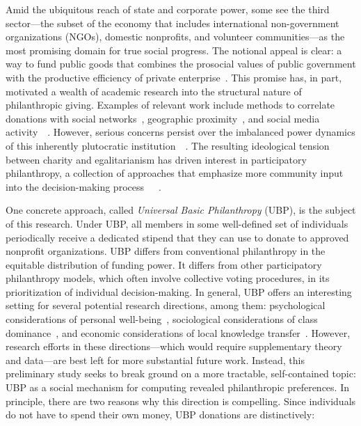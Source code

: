 Amid the ubiquitous reach of state and corporate power, some see the third sector---the subset of the economy that includes international non-government organizations (NGOs), domestic nonprofits, and volunteer communities---as the most promising domain for true social progress.
The notional appeal is clear: a way to fund public goods that combines the prosocial values of public government with the productive efficiency of private enterprise~\cite{etzioni1973third}.
This promise has, in part, motivated a wealth of academic research into the structural nature of philanthropic giving.
Examples of relevant work include methods to correlate donations with social networks~\cite{apinunmahakul2008social}, geographic proximity~\cite{chapman2022give}, and social media activity~\cite{korolov2016predicting}~\cite{saxton2014social}.
However, serious concerns persist over the imbalanced power dynamics of this inherently plutocratic institution~\cite{maclean2021elite}~\cite{reich2020just}.
The resulting ideological tension between charity and egalitarianism has driven interest in participatory philanthropy, a collection of approaches that emphasize more community input into the decision-making process~\cite{meyer2021walking}~\cite{hauger2023nothing}~\cite{bhati2020literature}.

One concrete approach, called \emph{Universal Basic Philanthropy} (UBP), is the subject of this research.
Under UBP, all members in some well-defined set of individuals periodically receive a dedicated stipend that they can use to donate to approved nonprofit organizations.
UBP differs from conventional philanthropy in the equitable distribution of funding power.
It differs from other participatory philanthropy models, which often involve collective voting procedures, in its prioritization of individual decision-making.
In general, UBP offers an interesting setting for several potential research directions, among them: psychological considerations of personal well-being~\cite{anik2009feeling}, sociological considerations of class dominance~\cite{silver2007disentangling}, and economic considerations of local knowledge transfer~\cite{wandel2014nonprofit}.
However, research efforts in these directions---which would require supplementary theory and data---are best left for more substantial future work.
Instead, this preliminary study seeks to break ground on a more tractable, self-contained topic: UBP as a social mechanism for computing revealed philanthropic preferences.
In principle, there are two reasons why this direction is compelling. 
Since individuals do not have to spend their own money, UBP donations are distinctively:

